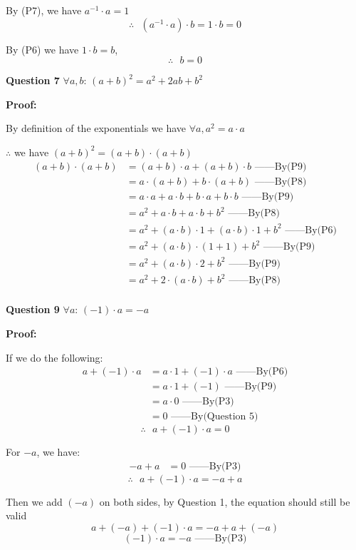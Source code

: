 \documentclass[a4paper,12pt]{report}
\begin{document}
\noindent
By (P7), we have $a^{-1}\cdot{a} = 1$\[\therefore \text{ }(a^{-1}\cdot{a})\cdot{b} = 1\cdot{b} = 0\]

\noindent
By (P6) we have $1\cdot{b} = b$,\[\therefore \text{ } b = 0\]

\noindent
\textbf{Question 7} $\forall a,b$: $(a+b)^2=a^2+2ab+b^2$

\noindent
\textbf{Proof:}

\noindent
By definition of the exponentials we have $\forall a, a^2 = a\cdot{a}$

\noindent
$\therefore$ we have $(a+b)^2 = (a+b)\cdot{(a+b)}$
\begin{align*}
 (a+b)\cdot{(a+b)} & = (a+b)\cdot{a} + (a+b)\cdot{b} \text{ ------By(P9)}\\
      & = a\cdot{(a+b)} + b\cdot{(a+b)} \text{ ------By(P8)}\\
      & = a\cdot{a} + a\cdot{b} + b\cdot{a} + b\cdot{b} \text{ ------By(P9)}\\
      & = a^2 + a\cdot{b} + a\cdot{b} + b^2 \text{ ------By(P8)}\\
      & = a^2 + (a\cdot{b})\cdot{1} + (a\cdot{b})\cdot{1} + b^2 \text{ ------By(P6)}\\
      & = a^2 + (a\cdot{b})\cdot{(1+1)} + b^2 \text{ ------By(P9)}\\
      & = a^2 + (a\cdot{b})\cdot{2} + b^2 \text{ ------By(P9)}\\
      & = a^2 + 2\cdot{(a\cdot{b})} + b^2 \text{ ------By(P8)}\\
\end{align*}

\noindent
\textbf{Question 9} $\forall a$: $(-1)\cdot{a}=-a$

\noindent
\textbf{Proof:}

\noindent
If we do the following: 
\begin{align*}
 a + (-1)\cdot{a} & = a\cdot{1} + (-1)\cdot{a} \text{ ------By(P6)}\\
      & = a\cdot{1+(-1)} \text{ ------By(P9)}\\
      & = a\cdot{0} \text{ ------By(P3)}\\
      & = 0 \text{ ------By(Question 5)}
\end{align*}
\[\therefore \text{ } a + (-1)\cdot{a} = 0\]

For $-a$, we have:
\begin{align*}
 -a + a & = 0 \text{ ------By(P3)}
\end{align*}
\[\therefore \text{ } a + (-1)\cdot{a} =  -a + a\]

\noindent
Then we add $(-a)$ on both sides, by Question 1, the equation should still be valid
\[a  +(-a) + (-1)\cdot{a} =  -a + a +(-a)\]
\[(-1)\cdot{a}=-a\text{ ------By(P3)}\]
\end{document}
